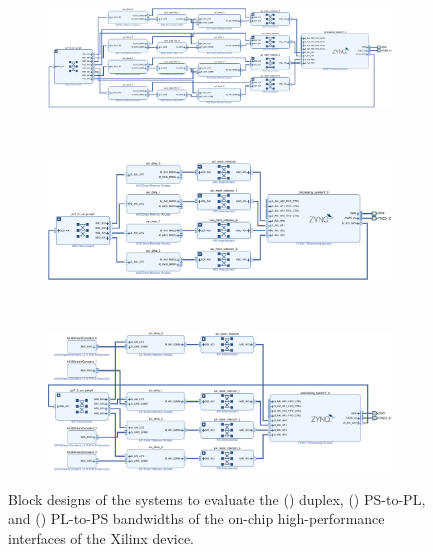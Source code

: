 \begin{figure}[!t]
    \centering
    \begin{subfigure}[m]{\linewidth}
        \includegraphics[width=\linewidth]{figures/xilinx_portrait_duplex.pdf}
        \caption{}
        \label{fig:xilinx_duplex}
    \end{subfigure}\\\medskip
    \begin{subfigure}[m]{\linewidth}
        \includegraphics[width=\linewidth]{figures/xilinx_portrait_ps2pl.pdf}
        \caption{}
        \label{fig:xilinx_ps2pl}
    \end{subfigure}\\\medskip
    \begin{subfigure}[m]{\linewidth}
        \includegraphics[width=\linewidth]{figures/xilinx_portrait_pl2ps.pdf}
        \caption{}
        \label{fig:xilinx_pl2ps}
    \end{subfigure}
    \caption{Block designs of the systems to evaluate the () duplex, () \ac{PS}-to-\ac{PL}, and () \ac{PL}-to-\ac{PS} bandwidths of the on-chip high-performance interfaces of the Xilinx device.}
    \label{fig:xilinx_systems}
\end{figure}

